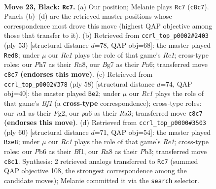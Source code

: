 \documentclass[11pt]{article}
\begin{document}
\clearpage

\begin{figure}[p]\centering
\begin{subfigure}{0.46\textwidth}\centering
\resizebox{\linewidth}{!}{%
\newchessgame
\chessboard[
  setfen={rnr3k1/p4pbp/Pp6/1P1nN1R1/4p1P1/8/4BP2/R1B1K3 b Q - 0 23},
  showmover=false,
  pgfstyle=straightmove, color=movearrow, markmove={c8-c7}
]}
\caption{}
\end{subfigure}\hfill
\begin{subfigure}{0.46\textwidth}\centering
\resizebox{\linewidth}{!}{%
\newchessgame
\chessboard[
  setfen={r3r1k1/5p2/p6p/R1np2p1/P7/3nP1B1/3N1PPP/5RK1 b - - 1 27},
  showmover=false,
  pgfstyle=straightmove, color=movearrow, markmove={e8-d8}
]}
\caption{}
\end{subfigure}
\\[4pt]
\begin{subfigure}{0.46\textwidth}\centering
\resizebox{\linewidth}{!}{%
\newchessgame
\chessboard[
  setfen={2r5/1br2pk1/pp4p1/n6p/P2Pp2P/R1N1P3/2R2PPK/5B2 w - - 2 30},
  showmover=false,
  pgfstyle=straightmove, color=movearrow, markmove={f1-e2}
]}
\caption{}
\end{subfigure}\hfill
\begin{subfigure}{0.46\textwidth}\centering
\resizebox{\linewidth}{!}{%
\newchessgame
\chessboard[
  setfen={2r1n3/1p1b1pkp/p2r2p1/6P1/P2N3P/1P1R1P2/8/4RBK1 w - - 1 31},
  showmover=false,
  pgfstyle=straightmove, color=movearrow, markmove={e1-e8}
]}
\caption{}
\end{subfigure}
\caption{\textbf{Move 23, Black: \texttt{Rc7}.} (a) Our position; Melanie plays \texttt{Rc7} (\texttt{c8c7}). Panels (b)--(d) are the retrieved master positions whose correspondence most drove this move (highest QAP objective among those that transfer to it). (b) Retrieved from \texttt{ccrl\_top\_p0002\#2403} (ply 53) [structural distance $d$=78, QAP obj=68]: the master played \texttt{Red8}; under $\mu$ our \emph{Rc1} plays the role of that game's \emph{Re1}; cross-type roles: our \emph{P}h7 as their \emph{R}a8, our \emph{B}g7 as their \emph{P}a6; transferred move \texttt{c8c7} \textbf{(endorses this move)}. (c) Retrieved from \texttt{ccrl\_top\_p0002\#378} (ply 58) [structural distance $d$=74, QAP obj=40]: the master played \texttt{Be2}; under $\mu$ our \emph{Rc1} plays the role of that game's \emph{Bf1} (a \textbf{cross-type} correspondence); cross-type roles: our \emph{r}a1 as their \emph{P}g2, our \emph{p}a6 as their \emph{R}a3; transferred move \texttt{c8c7} \textbf{(endorses this move)}. (d) Retrieved from \texttt{ccrl\_top\_p0000\#3503} (ply 60) [structural distance $d$=71, QAP obj=54]: the master played \texttt{Rxe8}; under $\mu$ our \emph{Rc1} plays the role of that game's \emph{Re1}; cross-type roles: our \emph{P}b6 as their \emph{B}f1, our \emph{R}a8 as their \emph{P}b3; transferred move \texttt{c8c1}. Synthesis: 2 retrieved analogs transferred to \texttt{Rc7} (summed QAP objective 108, the strongest correspondence among the candidate moves); Melanie committed it via the \texttt{search} selector.}
\label{fig:thought-m45}
\end{figure}
\end{document}
